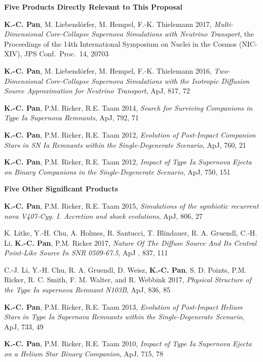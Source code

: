 \documentclass[10pt,letterpaper]{article}
\begin{document}
{\large \bf Five Products Directly Relevant to This Proposal}

{\bf K.-C. Pan}, M. Liebend\"{o}rfer, M. Hempel, F.-K. Thielemann 2017, \emph{Multi-Dimensional Core-Collapse Supernova Simulations with Neutrino Transport}, the Proceedings of the 14th International Symposium on Nuclei in the Cosmos (NIC-XIV), JPS Conf.~Proc.~14, 20703

{\bf K.-C. Pan}, M. Liebend\"{o}rfer, M. Hempel, F.-K. Thielemann 2016, \emph{Two-Dimensional Core-Collapse Supernova Simulations with the Isotropic Diffusion Source Approximation for Neutrino Transport}, ApJ, 817, 72

 {\bf K.-C. Pan}, P.M. Ricker, R.E. Taam 2014, \emph{Search for Surviving Companions in Type Ia Supernova Remnants}, ApJ, 792, 71

{\bf K.-C. Pan}, P.M. Ricker, R.E. Taam 2012, \emph{Evolution of Post-Impact Companion Stars in SN Ia Remnants within the Single-Degenerate Scenario}, ApJ, 760, 21

{\bf K.-C. Pan}, P.M. Ricker, R.E. Taam 2012, \emph{Impact of Type Ia Supernova Ejecta on Binary Companions in the Single-Degenerate Scenario}, ApJ, 750, 151


\vspace{.1in}
{\large \bf Five Other Significant Products}

 {\bf K.-C. Pan}, P.M. Ricker, R.E. Taam 2015, \emph{Simulations of the symbiotic recurrent nova V407-Cyg. I. Accretion and shock evolutions}, ApJ, 806, 27

K. Litke, Y.-H. Chu, A. Holmes, R. Santucci, T. Blindauer, R. A. Gruendl, C.-H. Li, {\bf K.-C. Pan}, P.M. Ricker 2017, \emph{Nature Of The Diffuse Source And Its Central Point-Like Source In SNR 0509-67.5}, ApJ , 837, 111

C.-J. Li, Y.-H. Chu, R. A. Gruendl, D. Weisz,  {\bf K.-C. Pan}, S. D. Points, P.M. Ricker, R. C. Smith, F. M. Walter, and R. Webbink 2017, \emph{Physical Structure of the Type Ia supernova Remnant N103B}, ApJ, 836, 85

{\bf K.-C. Pan}, P.M. Ricker, R.E. Taam 2013, \emph{Evolution of Post-Impact Helium Stars in Type Ia Supernova Remnants within the Single-Degenerate Scenario}, ApJ, 733, 49

{\bf K.-C. Pan}, P.M. Ricker, R.E. Taam 2010, \emph{Impact of Type Ia Supernova Ejecta on a Helium Star Binary Companion}, ApJ, 715, 78


\begin{tabular*}{\textwidth}{l}\hline\end{tabular*}
\end{document}
